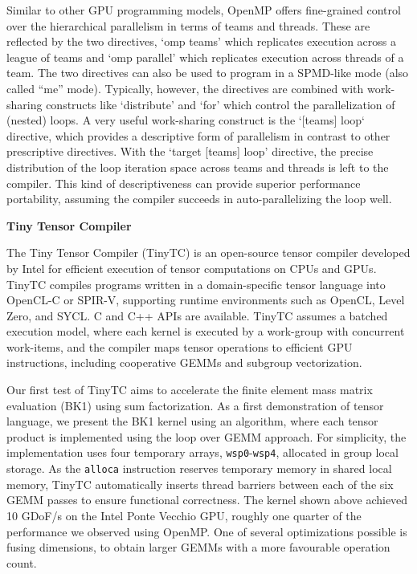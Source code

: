 \documentclass[a4paper,12pt, numbers]{article}
\begin{document}
Similar to other GPU programming models, OpenMP offers fine-grained control over the hierarchical parallelism in terms of teams and threads. These are reflected by the two directives, `omp teams' which replicates execution across a league of teams and `omp parallel' which replicates execution across threads of a team.  The two directives can also be used to program in a SPMD-like mode (also called ``me'' mode). Typically, however, the directives are combined with work-sharing constructs like `distribute' and `for' which control the parallelization of (nested) loops. A very useful work-sharing construct is the `[teams] loop` directive, which provides  a descriptive form of parallelism in contrast to other prescriptive directives. With the `target [teams] loop' directive, the precise distribution of the loop iteration space across teams and threads is left to the compiler. This kind of descriptiveness can provide superior performance portability, assuming the compiler succeeds in auto-parallelizing the loop well.

\noindent\textbf{Tiny Tensor Compiler}

The Tiny Tensor Compiler (TinyTC) is an open-source tensor compiler developed by Intel for efficient execution of tensor computations on CPUs and GPUs. TinyTC compiles programs written in a domain-specific tensor language into OpenCL-C or SPIR-V, supporting runtime environments such as OpenCL, Level Zero, and SYCL. C and C++ APIs are available. TinyTC assumes a batched execution model, where each kernel is executed by a work-group with concurrent work-items, and the compiler maps tensor operations to efficient GPU instructions, including cooperative GEMMs and subgroup vectorization.

Our first test of TinyTC aims to accelerate the finite element mass matrix evaluation (BK1) using sum factorization. As a first demonstration of tensor language, we present the BK1 kernel using an algorithm, where each tensor product is implemented using the loop over GEMM approach. For simplicity, the implementation uses four temporary arrays, \texttt{wsp0}-\texttt{wsp4}, allocated in group local storage. As the \texttt{alloca} instruction reserves temporary memory in shared local memory, TinyTC automatically inserts thread barriers between each of the six GEMM passes to ensure functional correctness. The kernel shown above achieved 10 GDoF/s on the Intel Ponte Vecchio GPU, roughly one quarter of the performance we observed using OpenMP. One of several optimizations possible is fusing dimensions, to obtain larger GEMMs with a more favourable operation count. 
\end{document}
